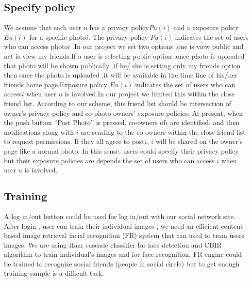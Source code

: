 \subsection[Specify Policy]{Specify policy}
We assume that each user u has a privacy policy$Pu(i)$ and a exposure policy $Eu(i)$ for a specific photo$ i$. The privacy policy $Pu(i)$ indicates the set of users who can access photo$ i $
.In our project we set two options ,one is view public and net is view my friends.If a user is selecting public option ,once photo is uploaded  that photo will be shown publically ,if he/ she is setting only my friends option then once the photo is  uploaded ,it  will be available in the time line of his/her friends home page.Exposure policy $Eu(i)$ indicates the set of users who can access$ i$ when user $u$ is involved.In our project we limited this within the close friend list. According to our scheme, this friend list should be intersection of owner’s privacy policy and co-photo owners’ exposure policies. At present, when the push button “Post Photo” is pressed, co-owners of$ i$ are identified, and then notifications along with $i$ are sending to the co-owners  within the close friend list to request permissions. If they all agree to post$ i$, $i$ will be shared on the owner’s page like a normal photo. In this sense, users could specify their privacy policy but their exposure policies are depends the set of users who can access $i$ when user $u$ is involved.
\subsection[Training]{Training}
A log in/out button could be used for log in/out with our social network site. After login , user can train their individual images , we need an efficient content based image retrieval facial recognition (FR) system that can used to train users images. We are using Haar cascade classifier for face detection and CBIR algorithm to train individual’s images and for face recognition.  FR engine could be trained to recognize social friends (people in social circle) but to get enough training sample is a difficult task.
 

